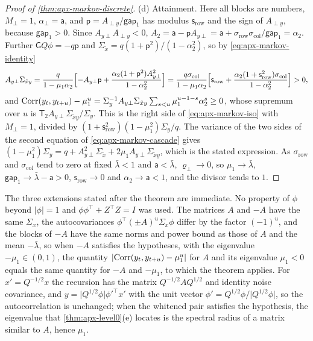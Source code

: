 \begin{proof}[Proof of \cref{thm:apx-markov-discrete}]
(d) Attainment. Here all blocks are numbers, $M_\perp=1$, $\alpha_\perp=\mathsf a$, and $\mathsf p=A_{\perp y}/\mathsf{gap}_1$ has modulus $\mathsf s_{\mathrm{row}}$ and the sign of $A_{\perp y}$, because $\mathsf{gap}_1>0$. Since $A_{y\perp}A_{\perp y}<0$, $A_2=\mathsf a-\mathsf pA_{y\perp}=\mathsf a+\sigma_{\mathrm{row}}\sigma_{\mathrm{col}}/\mathsf{gap}_1=\alpha_2$. Further $\mathsf GQ\phi=-q\mathsf p$ and $\Sigma_{\tilde x}=q(1+\mathsf p^2)/(1-\alpha_2^2)$, so by \eqref{eq:apx-markov-identity}
\begin{equation*}
A_{y\perp}\Sigma_{\tilde xy}=\frac q{1-\mu_1\alpha_2}\Bigl[-A_{y\perp}\mathsf p+\frac{\alpha_2(1+\mathsf p^2)A_{y\perp}^2}{1-\alpha_2^2}\Bigr]=\frac{q\sigma_{\mathrm{col}}}{1-\mu_1\alpha_2}\Bigl[\mathsf s_{\mathrm{row}}+\frac{\alpha_2(1+\mathsf s_{\mathrm{row}}^2)\sigma_{\mathrm{col}}}{1-\alpha_2^2}\Bigr]>0 ,
\end{equation*}
and $\operatorname{Corr}(y_t,y_{t+u})-\mu_1^u=\Sigma_y^{-1}A_{y\perp}\Sigma_{\tilde xy}\sum_{s<u}\mu_1^{u-1-s}\alpha_2^s\ge0$, whose supremum over $u$ is $\mathsf T_2A_{y\perp}\Sigma_{\tilde xy}/\Sigma_y$. This is the right side of \eqref{eq:apx-markov-iso} with $M_\perp=1$, divided by $(1+\mathsf s_{\mathrm{row}}^2)(1-\mu_1^2)\Sigma_y/q$. The variance of the two sides of the second equation of \eqref{eq:apx-markov-cascade} gives $(1-\mu_1^2)\Sigma_y=q+A_{y\perp}^2\Sigma_{\tilde x}+2\mu_1A_{y\perp}\Sigma_{\tilde xy}$, which is the stated expression. As $\sigma_{\mathrm{row}}$ and $\sigma_{\mathrm{col}}$ tend to zero at fixed $\bar\lambda<1$ and $\mathsf a<\bar\lambda$, $\varrho_\perp\to0$, so $\mu_1\to\bar\lambda$, $\mathsf{gap}_1\to\bar\lambda-\mathsf a>0$, $\mathsf s_{\mathrm{row}}\to0$ and $\alpha_2\to\mathsf a<1$, and the divisor tends to $1$.
\end{proof}

The three extensions stated after the theorem are immediate. No property of $\phi$ beyond $\lvert\phi\rvert=1$ and $\phi\phi^\top+Z^\top Z=I$ was used. The matrices $A$ and $-A$ have the same $\Sigma_x$, the autocovariances $\phi^\top(\pm A)^u\Sigma_x\phi$ differ by the factor $(-1)^u$, and the blocks of $-A$ have the same norms and power bound as those of $A$ and the mean $-\bar\lambda$, so when $-A$ satisfies the hypotheses, with the eigenvalue $-\mu_1\in(0,1)$, the quantity $\lvert\operatorname{Corr}(y_t,y_{t+u})-\mu_1^u\rvert$ for $A$ and its eigenvalue $\mu_1<0$ equals the same quantity for $-A$ and $-\mu_1$, to which the theorem applies. For $x'=Q^{-1/2}x$ the recursion has the matrix $Q^{-1/2}AQ^{1/2}$ and identity noise covariance, and $y=\lvert Q^{1/2}\phi\rvert\phi'^\top x'$ with the unit vector $\phi'=Q^{1/2}\phi/\lvert Q^{1/2}\phi\rvert$, so the autocorrelation is unchanged; when the whitened pair satisfies the hypothesis, the eigenvalue that \cref{thm:apx-level0}(e) locates is the spectral radius of a matrix similar to $A$, hence $\mu_1$.

